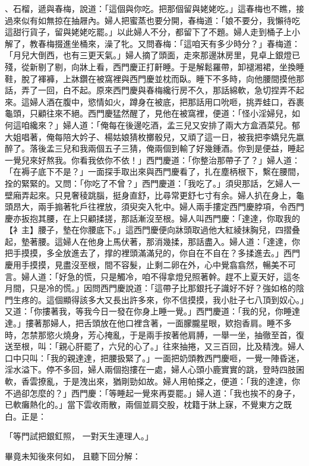 、石榴，遞與春梅，說道：「這個與你吃。把那個留與姥姥吃。」這春梅也不瞧，接過來似有如無掠在抽屜內。婦人把蜜蒸也要分開，春梅道：「娘不要分，我懶待吃這甜行貨子，留與姥姥吃罷。」以此婦人不分，都留下了不題。婦人走到桶子上小解了，教春梅掇進坐桶來，澡了牝。又問春梅：「這咱天有多少時分？」春梅道：「月兒大倒西，也有三更天氣。」婦人摘了頭面，走來那邊牀房里，見卓上銀燈已殘，從新剔了剔，向牀上看，西門慶正打鼾睡。于是解鬆羅帶，卸褪湘裙，坐換睡鞋，脫了褌褲，上牀鑽在被窩裡與西門慶並枕而臥。睡下不多時，向他腰間摸他那話，弄了一回，白不起。原來西門慶與春梅纔行房不久，那話綿軟，急切捏弄不起來。這婦人酒在腹中，慾情如火，蹲身在被底，把那話用口吮咂，挑弄蛙口，吞裹龜頭，只顧往來不絕。西門慶猛然醒了，見他在被窩裡，便道：「怪小淫婦兒，如何這咱纔來？」婦人道：「俺每在後邊吃酒，孟三兒又安排了兩大方盒酒菜兒。郁大姐唱著，俺每陪大妗子、楊姑娘猜枚擲骰兒，又頑了這一日，被我把李嬌兒先嬴醉了。落後孟三兒和我兩個五子三猜，俺兩個到輸了好幾鍾酒。你到是便益，睡起一覺兒來好熬我。你看我依你不依！」西門慶道：「你整治那帶子了？」婦人道：「在褥子底下不是？」一面探手取出來與西門慶看了，扎在塵柄根下，繫在腰間，拴的緊緊的。又問：「你吃了不曾？」西門慶道：「我吃了。」須臾那話，乞婦人一壁廂弄起來。只見奢稜跳腦，挺身直舒，比尋常更舒七寸有余。婦人扒在身上，龜頭昂大，兩手搧著牝戶往裡放，須臾突入牝中。婦人兩手摟定西門慶脖項，令西門慶亦扳抱其腰，在上只顧揉搓，那話漸沒至根。婦人叫西門慶：「達達，你取我的【衤主】腰子，墊在你腰底下。」這西門慶便向牀頭取過他大紅綾抹胸兒，四摺叠起，墊著腰。這婦人在他身上馬伏著，那消幾揉，那話盡入。婦人道：「達達，你把手摸摸，多全放進去了，撑的裡頭滿滿兒的，你自在不自在？多揉進去。」西門慶用手摸摸，見盡沒至根，間不容髮，止剩二卵在外，心中覺翕翕然，暢美不可言。婦人道：「好急的慌，只是觸冷，咱不得拿燈兒照著幹。趕不上夏天好，這冬月間，只是冷的慌。」因問西門慶說道：「這帶子比那銀托子識好不好？強如格的陰門生疼的。這個顯得該多大又長出許多來，你不信摸摸，我小肚子七八頂到奴心。」又道：「你摟著我，等我今日一發在你身上睡一覺。」西門慶道：「我的兒，你睡達達。」摟著那婦人，把舌頭放在他口裡含著，一面朦朧星眼，欵抱香肩。睡不多時，怎禁那慾火燒身，芳心掩亂，于是兩手按著他肩膊，一舉一坐，抽徹至首，復送至根，叫：「親心肝罷了，六兒的心了。」往來抽捲，又三百回，比及精洩。婦人口中只叫：「我的親達達，把腰扱緊了。」一面把奶頭教西門慶咂，一覺一陣昏迷，淫水溢下。停不多回，婦人兩個抱摟在一處，婦人心頭小鹿實實的跳，登時四肢囷軟，香雲撩亂，于是洩出來，猶剛勁如故。婦人用帕搽之，便道：「我的達達，你不過卻怎麼的？」西門慶：「等睡起一覺來再耍罷。」婦人道：「我也挨不的身子，已軟癱熱化的。」當下雲收雨散，兩個並肩交股，枕籍于牀上寐，不覺東方之既白。正是：

「等門試把銀釭照，  一對天生連理人。」

畢竟未知後來何如，  且聽下回分解：


